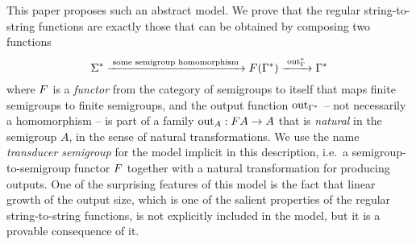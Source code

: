 This paper proposes such an abstract model.  We prove that the regular  string-to-string functions are exactly those that can be obtained by composing two functions
\[ \Sigma^* 
  \xrightarrow{\;\text{some semigroup homomorphism}\;}
    \functor(\Gamma^*)
    \xrightarrow{\;\outfun_\Gamma^*\;}
    \Gamma^*
\]
where $\functor$ is a \emph{functor} from the category of semigroups to itself that
maps finite semigroups to finite semigroups, and the output function
$\mathrm{out}_{\Gamma^*}$ -- not necessarily a homomorphism -- is part of a family
$\outfun_A : \functor A \to A$ that is \emph{natural} in the semigroup $A$, in the sense of natural transformations. We use the name \emph{transducer semigroup} for the model implicit in this description, i.e.~a semigroup-to-semigroup functor $\functor$ together with a natural transformation for producing outputs.  One of the surprising features of this model is the fact that linear growth of the output size, which is one of the salient properties of the regular string-to-string functions, is not explicitly included in the model, but it is a provable consequence of it. 



